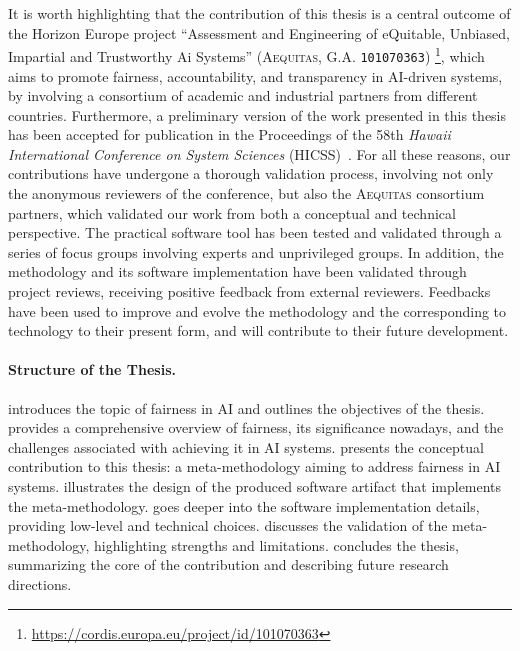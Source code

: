\documentclass[12pt,a4paper,openright,twoside]{book}
\newcommand{\aequitas}{\textsc{Aequitas}}
\begin{document}
It is worth highlighting that
the contribution of this thesis is a central outcome of the Horizon Europe project 
``Assessment and Engineering of eQuitable, Unbiased, Impartial and Trustworthy Ai Systems'' (\aequitas{}, G.A. \texttt{101070363})%
\footnote{\url{https://cordis.europa.eu/project/id/101070363}}, 
which aims to promote fairness, accountability, and transparency in \acs{AI}-driven systems,
by involving a consortium of academic and industrial partners from different countries.
%
Furthermore,
a preliminary version of the work presented in this thesis has been accepted for publication 
in the Proceedings of the 58th \textit{Hawaii International Conference on System Sciences} (HICSS)~\cite{hicssfairness2025}.
%
For all these reasons,
our contributions have undergone a thorough validation process, 
involving not only the anonymous reviewers of the conference, 
but also the \aequitas{} consortium partners,
which validated our work from both a conceptual and technical perspective. %
%
The practical software tool has been tested and validated through a series of focus groups involving experts and unprivileged groups.
%
In addition, 
the methodology and its software implementation have been validated through project reviews, 
receiving positive feedback from external reviewers.
%
Feedbacks have been used to improve and evolve the methodology and the corresponding to technology to their present form,
and will contribute to their future development.
%

\paragraph{Structure of the Thesis.}

 introduces the topic of fairness in \ac{AI} and outlines the objectives of the thesis.
%
 provides a comprehensive overview of fairness, its significance nowadays, and the challenges associated with achieving it in \ac{AI} systems.
%
 presents the conceptual contribution to this thesis: a meta-methodology aiming to address fairness in \ac{AI} systems.
%
 illustrates the design of the produced software artifact that implements the meta-methodology.
%
 goes deeper into the software implementation details, providing low-level and technical choices.
%
 discusses the validation of the meta-methodology, highlighting strengths and limitations.
%
 concludes the thesis, summarizing the core of the contribution and describing future research directions.
\end{document}
